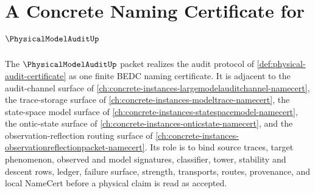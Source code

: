 \chapter{A Concrete Naming Certificate for $\PhysicalModelAuditUp$}
\label{ch:concrete-instances-physical-model-audit-namecert}

The $\PhysicalModelAuditUp$ packet realizes the audit protocol of \autoref{def:physical-audit-certificate} as one finite BEDC naming certificate. It is adjacent to the audit-channel surface of \autoref{ch:concrete-instances-largemodelauditchannel-namecert}, the trace-storage surface of \autoref{ch:concrete-instances-modeltrace-namecert}, the state-space model surface of \autoref{ch:concrete-instances-statespacemodel-namecert}, the ontic-state surface of \autoref{ch:concrete-instances-onticstate-namecert}, and the observation-reflection routing surface of \autoref{ch:concrete-instances-observationreflectionpacket-namecert}. Its role is to bind source traces, target phenomenon, observed and model signatures, classifier, tower, stability and descent rows, ledger, failure surface, strength, transports, routes, provenance, and local NameCert before a physical claim is read as accepted.

